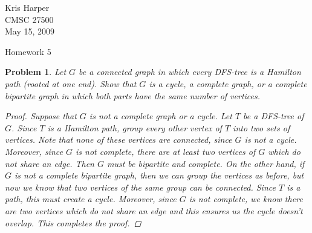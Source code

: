 \documentclass{article}
\newtheorem{problem}{Problem}
\begin{document}
\begin{flushright}
Kris Harper\\

CMSC 27500\\

May 15, 2009
\end{flushright}

\begin{center}
Homework 5
\end{center}

\begin{problem}
Let $G$ be a connected graph in which every DFS-tree is a Hamilton path (rooted at one end). Show that $G$ is a cycle, a complete graph, or a complete bipartite graph in which both parts have the same number of vertices.
\begin{proof}
Suppose that $G$ is not a complete graph or a cycle. Let $T$ be a DFS-tree of $G$. Since $T$ is a Hamilton path, group every other vertex of $T$ into two sets of vertices. Note that none of these vertices are connected, since $G$ is not a cycle. Moreover, since $G$ is not complete, there are at least two vertices of $G$ which do not share an edge. Then $G$ must be bipartite and complete. On the other hand, if $G$ is not a complete bipartite graph, then we can group the vertices as before, but now we know that two vertices of the same group can be connected. Since $T$ is a path, this must create a cycle. Moreover, since $G$ is not complete, we know there are two vertices which do not share an edge and this ensures us the cycle doesn't overlap. This completes the proof.
\end{proof}
\end{problem}
\end{document}
